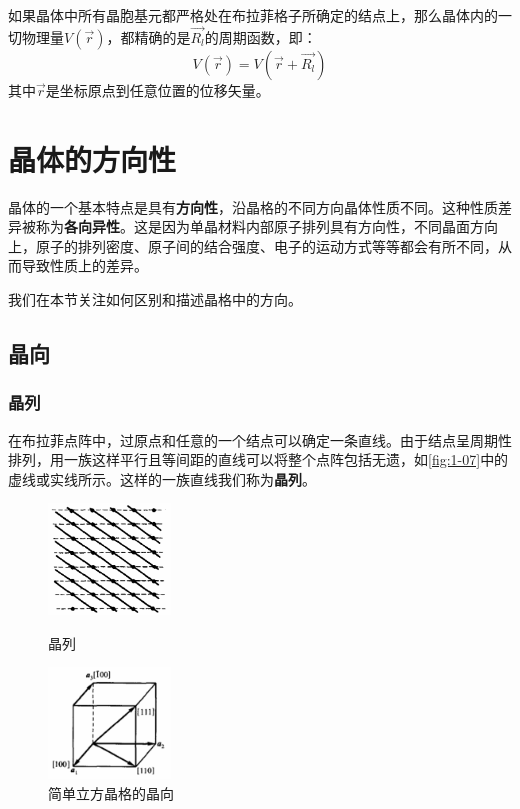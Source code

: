     如果晶体中所有晶胞基元都严格处在布拉菲格子所确定的结点上，那么晶体内的一切物理量$V(\vec{r})$，都精确的是$\vec{R_l}$的周期函数，即：
    \[
        V(\vec{r})=V(\vec{r}+\vec{R_l})
    \]
    其中$\vec{r}$是坐标原点到任意位置的位移矢量。\label{tag:Crystal_Periodicity}

\section{晶体的方向性}
    晶体的一个基本特点是具有\textbf{方向性}，沿晶格的不同方向晶体性质不同。这种性质差异被称为\textbf{各向异性}。这是因为单晶材料内部原子排列具有方向性，不同晶面方向上，原子的排列密度、原子间的结合强度、电子的运动方式等等都会有所不同，从而导致性质上的差异。

    我们在本节关注如何区别和描述晶格中的方向。
\subsection{晶向}
\subsubsection{晶列}
    在布拉菲点阵中，过原点和任意的一个结点可以确定一条直线。由于结点呈周期性排列，用一族这样平行且等间距的直线可以将整个点阵包括无遗，如\autoref{fig:1-07}中的虚线或实线所示。这样的一族直线我们称为\textbf{晶列}。

    \begin{figure}[!htbp]
        \centering
        \begin{minipage}[t]{0.45\linewidth}
            \centering    
            \includegraphics[height=8em, keepaspectratio=true]{pic/1-28}
            \caption{晶列}
            \label{fig:1-07}
        \end{minipage}
        \hfill
        \begin{minipage}[t]{0.45\linewidth}
            \centering
            \includegraphics[height=8em, keepaspectratio=true]{pic/1-29}
            \caption{简单立方晶格的晶向}
            \label{fig:1-08}
        \end{minipage}
    \end{figure}
    
